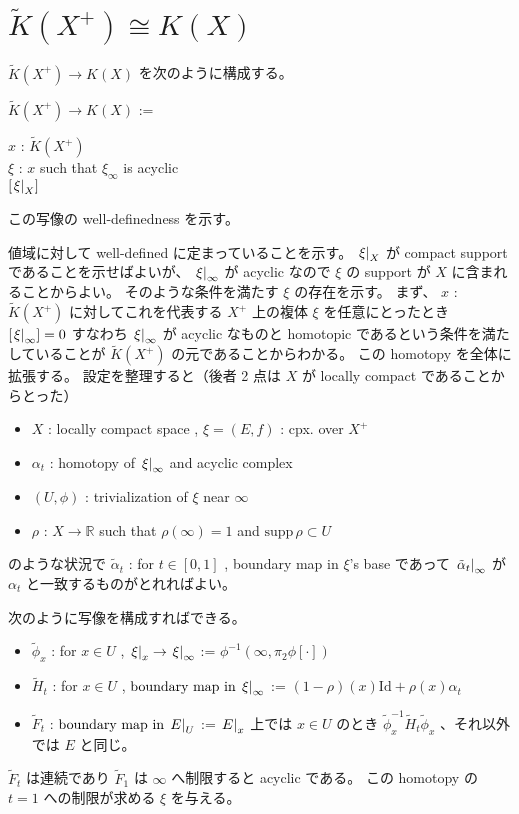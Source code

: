 \documentclass[dvipdfmx]{jsarticle}
\begin{document}
\newpage
\section{\(\tilde{K}(X^+) \cong K(X)\)}
\(\tilde{K}(X^+) \to K(X)\) を次のように構成する。
\begin{Definition}
  \itemdefi \Define \(\tilde{K}(X^+) \to K(X)\) :=
  \begin{indentblock}
    \For \(x\) : \(\tilde{K}(X^+)\) \\
    \Take \(\xi\) : \(x\) such that \(\xi_{\infty}\) is acyclic \\
    \Return \([\left. {\xi} \right| _{X}]\)
  \end{indentblock}
\end{Definition}
この写像の well-definedness を示す。
\begin{Proof}
\itemprof
  値域に対して well-defined に定まっていることを示す。
  \(\left. {\xi} \right| _{X}\) が compact support であることを示せばよいが、 \(\left. {\xi} \right| _{\infty}\) が acyclic なので \(\xi\) の support が \(X\) に含まれることからよい。
\itemprof
そのような条件を満たす \(\xi\) の存在を示す。
まず、 \(x\) : \(\tilde{K}(X^+)\) に対してこれを代表する \(X^+\) 上の複体 \(\xi\) を任意にとったとき \([\left. {\xi} \right| _{\infty}] = 0\) すなわち \(\left. {\xi} \right| _{\infty}\) が acyclic なものと homotopic であるという条件を満たしていることが \(\tilde{K}(X^+)\) の元であることからわかる。
この homotopy を全体に拡張する。
設定を整理すると（後者 2 点は \(X\) が locally compact であることからとった）
\begin{itemize}
  \item \(X\) : locally compact space , \(\xi = (E,f)\) : cpx. over \(X^+\)
  \item \(\alpha_t\) : homotopy of \(\left. {\xi} \right| _{\infty}\) and acyclic complex
  \item \((U,\phi)\) : trivialization of \(\xi\) near \(\infty\)
  \item \(\rho\) : \(X \to \mathbb{R}\) such that \(\rho(\infty) = 1\) and \(\text{supp} \, \rho \subset U\)
\end{itemize}
のような状況で \(\tilde{\alpha}_t\) : for \(t \in [0,1]\) , boundary map in \(\xi\)'s base であって \(\left. {\tilde{\alpha}_t} \right| _{\infty}\) が \(\alpha_t\) と一致するものがとれればよい。

次のように写像を構成すればできる。
\begin{itemize}
  \item \(\tilde{\phi}_x\) : for \(x \in U\) , \(\left. {\xi} \right| _{x} \to \left. {\xi} \right| _{\infty}\) := \(\phi^{-1}(\infty , \pi_2 \phi [\cdot])\)
  \item \(\tilde{H}_t\) : for \(x \in U\) , \(\text{boundary map in} \, \left. {\xi} \right| _{\infty}\) := \((1-\rho)(x) \text{Id} + \rho(x) \alpha_t\)
  \item \(\tilde{F}_t\) : \(\text{boundary map in} \, \left. {E} \right| _{U}\) := \(\left. {E} \right| _{x}\) 上では \(x \in U\) のとき \(\tilde{\phi}_x^{-1} \tilde{H}_t \tilde{\phi}_x\) 、それ以外では \(E\) と同じ。
\end{itemize}
\(\tilde{F}_t\) は連続であり \(\tilde{F}_1\) は \(\infty\) へ制限すると acyclic である。
この homotopy の \(t=1\) への制限が求める \(\xi\) を与える。


\end{Proof}
\end{document}
